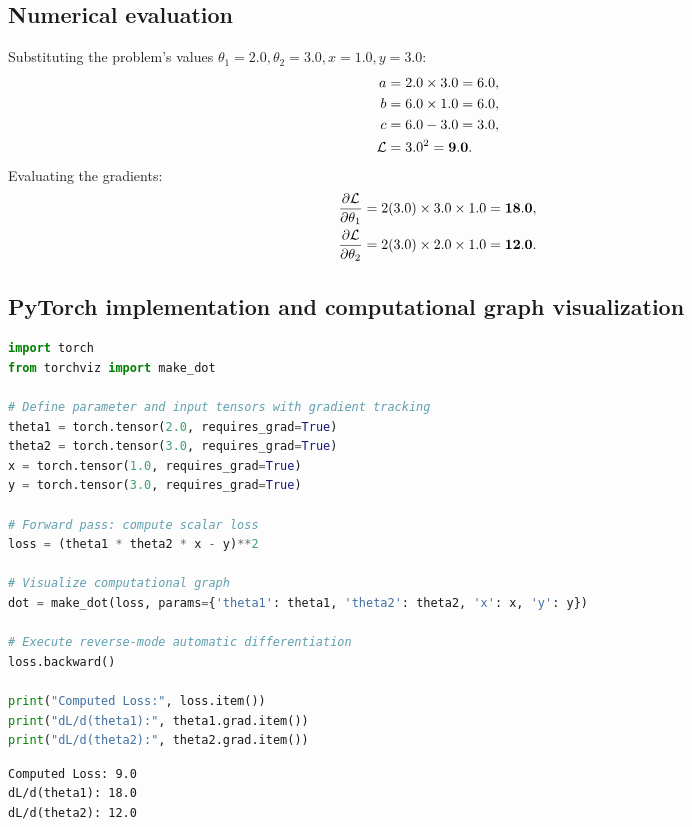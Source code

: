 \documentclass[../labs.tex]{subfiles}
\begin{document}
\subsection{Numerical evaluation}
Substituting the problem's values $\theta_1 = 2.0, \theta_2 = 3.0, x = 1.0, y = 3.0$:
\begin{align}
a &= 2.0 \times 3.0 = 6.0, \\
b &= 6.0 \times 1.0 = 6.0, \\
c &= 6.0 - 3.0 = 3.0, \\
\mathcal{L} &= 3.0^2 = \mathbf{9.0}.
\end{align}
Evaluating the gradients:
\begin{align}
\frac{\partial \mathcal{L}}{\partial \theta_1} &= 2(3.0) \times 3.0 \times 1.0 = \mathbf{18.0}, \\
\frac{\partial \mathcal{L}}{\partial \theta_2} &= 2(3.0) \times 2.0 \times 1.0 = \mathbf{12.0}.
\end{align}

\subsection{PyTorch implementation and computational graph visualization}

\begin{lstlisting}[language=Python, caption={Verified solution for Exercise 3 autograd calculation and visualization (Cells 83--84).}, label={lst:lab01_autograd_code}]
import torch
from torchviz import make_dot

# Define parameter and input tensors with gradient tracking
theta1 = torch.tensor(2.0, requires_grad=True)
theta2 = torch.tensor(3.0, requires_grad=True)
x = torch.tensor(1.0, requires_grad=True)
y = torch.tensor(3.0, requires_grad=True)

# Forward pass: compute scalar loss
loss = (theta1 * theta2 * x - y)**2

# Visualize computational graph
dot = make_dot(loss, params={'theta1': theta1, 'theta2': theta2, 'x': x, 'y': y})

# Execute reverse-mode automatic differentiation
loss.backward()

print("Computed Loss:", loss.item())
print("dL/d(theta1):", theta1.grad.item())
print("dL/d(theta2):", theta2.grad.item())
\end{lstlisting}

\begin{lstlisting}[style=terminalOutput]
Computed Loss: 9.0
dL/d(theta1): 18.0
dL/d(theta2): 12.0
\end{lstlisting}
\end{document}
